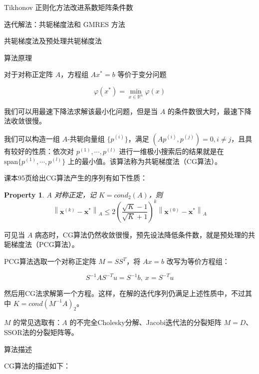 \documentclass[a4paper]{article}
\newtheorem{myProp}{Property}
\begin{document}
\begin{multicols}{2}
\begin{section}{Tikhonov 正则化方法改进系数矩阵条件数}
\end{section}

\begin{section}{迭代解法：共轭梯度法和 GMRES 方法}

	\begin{subsection}{共轭梯度法及预处理共轭梯度法}
	
		\begin{subsubsection}{算法原理}
		
			对于对称正定阵 $A$，方程组 $Ax^{*}=b$ 等价于变分问题 
			
			$$\varphi(x^*) = \min_{x\in \mathbb{R}^n} \varphi(x)$$
			
			我们可以用最速下降法求解该最小化问题，但是当 $A$ 的条件数很大时，最速下降法收敛很慢。
			
			我们可以构造一组 $A$-共轭向量组 $\{p^{(i)}\}$，满足 $(Ap^{(i)},p^{(j)})=0, i\ne j$，且具有较好的性质：依次对 $p^{(1)},\cdots,p^{(l)}$ 进行一维极小搜索后的结果就是在 $\text{span}\{p^{(1)},\cdots,p^{(l)}\}$ 上的最小值。该算法称为共轭梯度法（CG算法）。
			
			课本95页给出CG算法产生的序列有如下性质：
			
			\begin{myProp}
				$A$ 对称正定，记 $K = cond_2(A)$，则
				$$\left\|\mathbf{x}^{(k)}-\mathbf{x}^{*}\right\|_{A} \leq 2\left(\frac{\sqrt{K}-1}{\sqrt{K}+1}\right)^{k}\left\|\mathbf{x}^{(0)}-\mathbf{x}^{*}\right\|_{A}$$
			\end{myProp}
			
			可见当 $A$ 病态时，CG算法仍然收敛很慢，预先设法降低条件数，就是预处理的共轭梯度法（PCG算法）。
			
			PCG算法选取一个对称正定阵 $M=SS^T$，将 $Ax=b$ 改写为等价方程组：
			
			$$S^{-1}AS^{-T}u = S^{-1}b,\ x=S^{-T}u$$
			
			然后用CG法求解第一个方程。这样，在解的迭代序列仍满足上述性质中，不过其中 $K=cond(M^{-1}A)_2$。
			
			$M$ 的常见选取有：$A$ 的不完全Cholesky分解、Jacobi迭代法的分裂矩阵 $M=D$、SSOR法的分裂矩阵等。
		
		\end{subsubsection}
	
		\begin{subsubsection}{算法描述}
		
			CG算法的描述如下：
			

\end{subsubsection}
\end{subsection}
\end{section}
\end{multicols}
\end{document}
